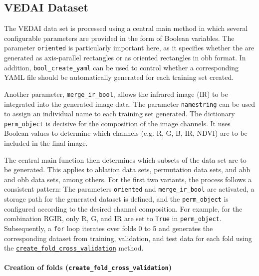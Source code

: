\subsection{VEDAI Dataset}
\label{subsec:impl_VEDAI}


The \acrshort{VEDAI} data set is processed using a central main method in which several configurable parameters are provided in the form of Boolean variables. The parameter \lstinline|oriented| is particularly important here, as it specifies whether the  are generated as axis-parallel rectangles or as oriented rectangles in \acrshort{obb} format. In addition, \lstinline|bool_create_yaml| can be used to control whether a corresponding \acrshort{YAML} file should be automatically generated for each training set created.

Another parameter, \lstinline|merge_ir_bool|, allows the infrared image (IR) to be integrated into the generated image data. The parameter \lstinline|namestring| can be used to assign an individual name to each training set generated. The dictionary \lstinline|perm_object| is decisive for the composition of the image channels. It uses Boolean values to determine which channels (e.g. \acrshort{R}, \acrshort{G}, \acrshort{B}, \acrshort{IR}, \acrshort{NDVI}) are to be included in the final image.

The central main function then determines which subsets of the data set are to be generated. This applies to ablation data sets, permutation data sets, and \acrshort{abb} and \acrshort{obb} data sets, among others. For the first two variants, the process follows a consistent pattern: The parameters \lstinline|oriented| and \lstinline|merge_ir_bool| are activated, a storage path for the generated dataset is defined, and the \lstinline|perm_object| is configured according to the desired channel composition. For example, for the combination \acrshort{RGIR}, only \acrshort{R}, \acrshort{G}, and \acrshort{IR} are set to \lstinline|True| in \lstinline|perm_object|. Subsequently, a \texttt{for} loop iterates over folds 0 to 5 and generates the corresponding dataset from training, validation, and test data for each fold using the \hyperlink{par:create_fold_cv}{\lstinline|create_fold_cross_validation|} method.

\paragraph{Creation of folds (\lstinline|create_fold_cross_validation|)}
\hypertarget{par:create_fold_cv}{}

